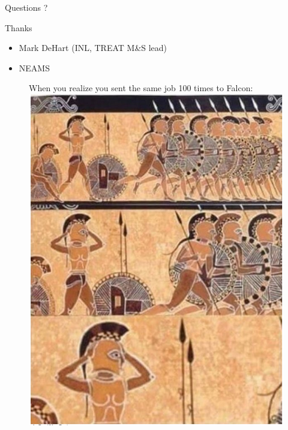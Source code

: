 \documentclass[8pt]{beamer}
\begin{document}
\begin{frame}{Questions ?}


\begin{block}{Thanks}
\begin{itemize}
\item Mark DeHart (INL, TREAT M\&S lead)
\item NEAMS
\end{itemize}

\begin{block}{}
\begin{figure}
	When you realize you sent the same job 100 times to Falcon:
	\centering
	\includegraphics[scale=0.25]{./final_fig.png}
\end{figure}
\end{block}

\end{block}

\end{frame}
\end{document}
